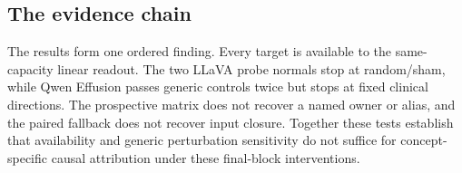 \subsection{The evidence chain}

The results form one ordered finding. Every target is available to the same-capacity linear readout. The two LLaVA probe normals stop at random/sham, while Qwen Effusion passes generic controls twice but stops at fixed clinical directions. The prospective matrix does not recover a named owner or alias, and the paired fallback does not recover input closure. Together these tests establish that availability and generic perturbation sensitivity do not suffice for concept-specific causal attribution under these final-block interventions.
